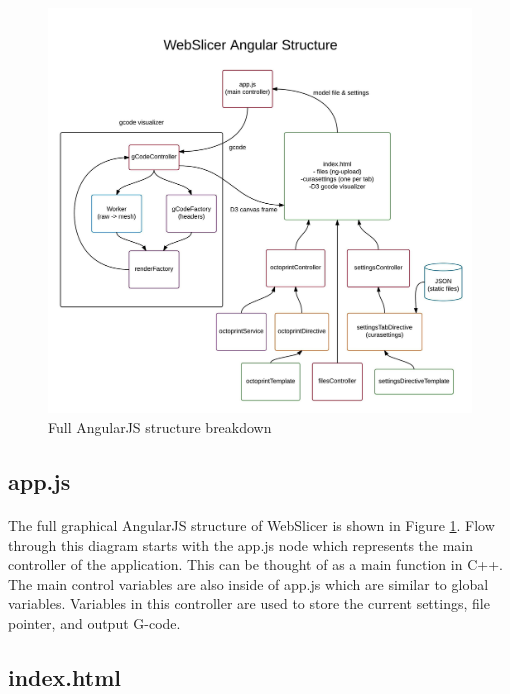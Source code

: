 \begin{figure}[!ht]
  \centering
  \includegraphics[width=\linewidth]{diagrams/Client-Side-Structure}
  \caption{Full AngularJS structure breakdown}
  \label{fig:client-side-structure}
\end{figure}

\subsection{app.js}%
\paragraph{}
The full graphical AngularJS structure of WebSlicer is shown in Figure \ref{fig:client-side-structure}.
Flow through this diagram starts with the app.js node which represents the main controller of the application.
This can be thought of as a main function in C++.
The main control variables are also inside of app.js which are similar to global variables.
Variables in this controller are used to store the current settings, file pointer, and output G-code.

\subsection{index.html}%
